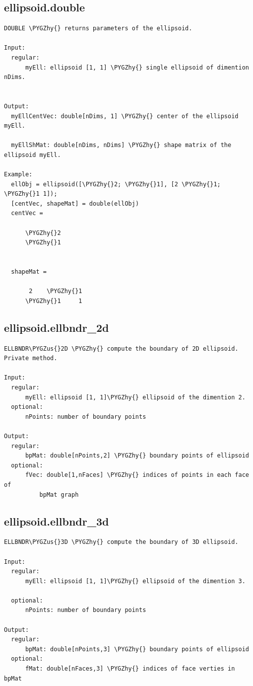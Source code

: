 \documentclass[letterpaper,10pt,english]{sphinxmanual}
\def\PYGZus{\char`\_}
\def\PYGZhy{\char`\-}
\begin{document}
\subsection{ellipsoid.double}
\label{chap_functions:ellipsoid-double}
\begin{Verbatim}[commandchars=\\\{\}]
DOUBLE \PYGZhy{} returns parameters of the ellipsoid.

Input:
  regular:
      myEll: ellipsoid [1, 1] \PYGZhy{} single ellipsoid of dimention nDims.


Output:
  myEllCentVec: double[nDims, 1] \PYGZhy{} center of the ellipsoid myEll.

  myEllShMat: double[nDims, nDims] \PYGZhy{} shape matrix of the ellipsoid myEll.

Example:
  ellObj = ellipsoid([\PYGZhy{}2; \PYGZhy{}1], [2 \PYGZhy{}1; \PYGZhy{}1 1]);
  [centVec, shapeMat] = double(ellObj)
  centVec =

      \PYGZhy{}2
      \PYGZhy{}1


  shapeMat =

       2    \PYGZhy{}1
      \PYGZhy{}1     1
\end{Verbatim}


\subsection{ellipsoid.ellbndr\_2d}
\label{chap_functions:ellipsoid-ellbndr-2d}
\begin{Verbatim}[commandchars=\\\{\}]
ELLBNDR\PYGZus{}2D \PYGZhy{} compute the boundary of 2D ellipsoid. Private method.

Input:
  regular:
      myEll: ellipsoid [1, 1]\PYGZhy{} ellipsoid of the dimention 2.
  optional:
      nPoints: number of boundary points

Output:
  regular:
      bpMat: double[nPoints,2] \PYGZhy{} boundary points of ellipsoid
  optional:
      fVec: double[1,nFaces] \PYGZhy{} indices of points in each face of
          bpMat graph
\end{Verbatim}


\subsection{ellipsoid.ellbndr\_3d}
\label{chap_functions:ellipsoid-ellbndr-3d}
\begin{Verbatim}[commandchars=\\\{\}]
ELLBNDR\PYGZus{}3D \PYGZhy{} compute the boundary of 3D ellipsoid.

Input:
  regular:
      myEll: ellipsoid [1, 1]\PYGZhy{} ellipsoid of the dimention 3.

  optional:
      nPoints: number of boundary points

Output:
  regular:
      bpMat: double[nPoints,3] \PYGZhy{} boundary points of ellipsoid
  optional:
      fMat: double[nFaces,3] \PYGZhy{} indices of face verties in bpMat
\end{Verbatim}
\end{document}
